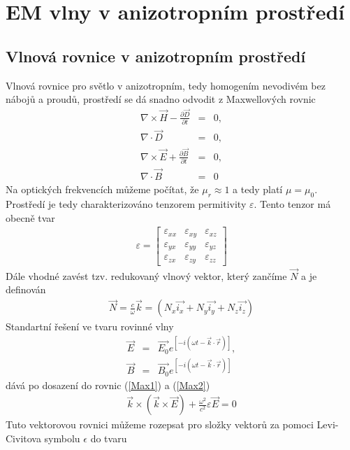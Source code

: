 \chapter{EM vlny v anizotropním prostředí}
\section{Vlnová rovnice v anizotropním prostředí}
Vlnová rovnice pro světlo v anizotropním, tedy homogením nevodivém bez nábojů a proudů, prostředí se dá snadno odvodit z Maxwellových rovnic
\begin{eqnarray}
\nabla \times\vec{H} - \frac{\partial\vec{D}}{\partial t} &=& 0 , \label{Max1} \\
\nabla \cdot \vec{D} &=& 0, \label{Max2} \\
\nabla \times \vec{E} + \frac{\partial \vec{B}}{\partial t} &=& 0, \label{Max3}\\
\nabla\cdot\vec{B}&=&0 \label{Max4}
\end{eqnarray}
Na optických frekvencích můžeme počítat, že $\mu_r\approx1$ a tedy platí $\mu=\mu_0$. Prostředí je tedy charakterizováno tenzorem permitivity $\varepsilon$. Tento tenzor má obecně tvar
\begin{eqnarray}
\varepsilon=
\begin{bmatrix}
\varepsilon_{xx} & \varepsilon_{xy} & \varepsilon_{xz} \\
\varepsilon_{yx}& \varepsilon_{yy}& \varepsilon_{yz} \\
\varepsilon_{zx}& \varepsilon_{zy}& \varepsilon_{zz}
\end{bmatrix}
\end{eqnarray}
Dále vhodné zavést tzv. redukovaný vlnový vektor, který zančíme $\vec{N}$ a je definován
\begin{eqnarray}
\vec{N}=\frac{c}{\omega}\vec{k} = (N_x\vec{i_x}+N_y\vec{i_y}+N_z\vec{i_z})
\end{eqnarray}
Standartní řešení ve tvaru rovinné vlny
\begin{eqnarray}
\vec{E} &=& \vec{E_0}e^{[-i(\omega t-\vec{k}\cdot\vec{r})]}, \\
\vec{B} &=& \vec{B_0}e^{[-i(\omega t-\vec{k}\cdot\vec{r})]}
\end{eqnarray}
dává po dosazení do rovnic (\ref{Max1}) a (\ref{Max2})
\begin{eqnarray}
\vec{k}\times(\vec{k}\times\vec{E}) + \frac{\omega^2}{c^2}\varepsilon\vec{E}=0
\end{eqnarray}
Tuto vektorovou rovnici můžeme rozepsat pro složky vektorů za pomoci Levi-Civitova symbolu $\epsilon$ do tvaru
